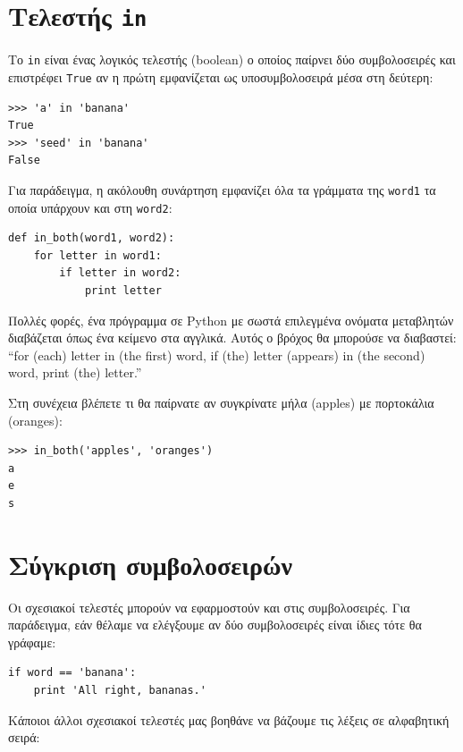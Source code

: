 \documentclass[10pt]{book}
\begin{document}
\section{Τελεστής {\tt in}}
\label{inboth}

Το {\tt in} είναι ένας λογικός τελεστής (boolean) ο οποίος παίρνει
δύο συμβολοσειρές και επιστρέφει {\tt True} αν η πρώτη εμφανίζεται ως υποσυμβολοσειρά μέσα στη δεύτερη:

\begin{verbatim}
>>> 'a' in 'banana'
True
>>> 'seed' in 'banana'
False
\end{verbatim}
%

Για παράδειγμα, η ακόλουθη συνάρτηση εμφανίζει όλα τα γράμματα της
{\tt word1} τα οποία υπάρχουν και στη {\tt word2}:

\begin{verbatim}
def in_both(word1, word2):
    for letter in word1:
        if letter in word2:
            print letter
\end{verbatim}
%

Πολλές φορές, ένα πρόγραμμα σε Python με σωστά επιλεγμένα ονόματα μεταβλητών διαβάζεται όπως ένα κείμενο στα αγγλικά. Αυτός ο βρόχος θα μπορούσε να διαβαστεί: ``for (each) letter in (the first) word,
if (the) letter (appears) in (the second) word, print (the) letter.''

Στη συνέχεια βλέπετε τι θα παίρνατε αν συγκρίνατε μήλα (apples) με πορτοκάλια (oranges):

\begin{verbatim}
>>> in_both('apples', 'oranges')
a
e
s
\end{verbatim}
%

\section{Σύγκριση συμβολοσειρών}

Οι σχεσιακοί τελεστές μπορούν να εφαρμοστούν και στις συμβολοσειρές. Για παράδειγμα, εάν θέλαμε να ελέγξουμε αν δύο συμβολοσειρές είναι ίδιες τότε θα γράφαμε:

\begin{verbatim}
if word == 'banana':
    print 'All right, bananas.'
\end{verbatim}
%

Κάποιοι άλλοι σχεσιακοί τελεστές μας βοηθάνε να βάζουμε τις λέξεις σε αλφαβητική σειρά:
\end{document}
